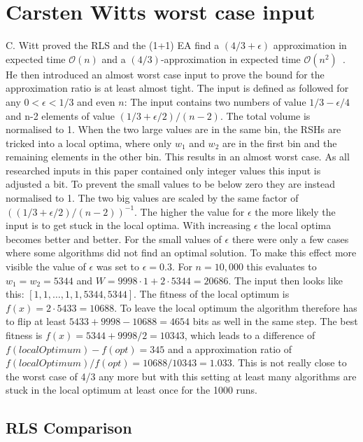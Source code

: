 \section{Carsten Witts worst case input}
C. Witt proved the RLS and the (1+1) EA find a $(4/3+\epsilon)$ approximation in expected time $\mathcal{O}(n)$ and a $(4/3)$-approximation in expected time $\mathcal{O}(n^2)$~\cite{diekert2005stacs}.
He then introduced an almost worst case input to prove the bound for the approximation ratio is at least almost tight.
The input is defined as followed for any $0<\epsilon<1/3$ and even $n$:\newline
The input contains two numbers of value $1/3 - \epsilon/4$ and n-2 elements of value $(1/3+\epsilon/2)/(n-2)$. 
The total volume is normalised to 1.
When the two large values are in the same bin, the RSHs are tricked into a local optima, where only $w_1$ and $w_2$ are in the first bin and the remaining elements in the other bin.
This results in an almost worst case.
As all researched inputs in this paper contained only integer values this input is adjusted a bit.
To prevent the small values to be below zero they are instead normalised to 1.
The two big values are scaled by the same factor of $((1/3+\epsilon/2)/(n-2))^{-1}$.
The higher the value for $\epsilon$ the more likely the input is to get stuck in the local optima.
With increasing $\epsilon$ the local optima becomes better and better.
For the small values of $\epsilon$ there were only a few cases where some algorithms did not find an optimal solution.
To make this effect more visible the value of $\epsilon$ was set to $\epsilon=0.3$.\newline
For $n=10,000$ this evaluates to $w_1=w_2=5344$ and $W=9998 \cdot 1 + 2 \cdot 5344 = 20686$.
The input then looks like this: $[1, 1, \dots, 1, 1, 5344, 5344]$.
The fitness of the local optimum is $f(x) = 2 \cdot 5433 = 10688$.
To leave the local optimum the algorithm therefore has to flip at least  $5433+9998-10688 = 4654$ bits as well in the same step.
The best fitness is $f(x) = 5344 + 9998/2 = 10343$, which leads to a difference of $f(localOptimum)-f(opt) = 345$ and a approximation ratio of $f(localOptimum)/f(opt)=10688/10343=1.033$.
This is not really close to the worst case of 4/3 any more but with this setting at least many algorithms are stuck in the local optimum at least once for the 1000 runs.
\subsection{RLS Comparison}


